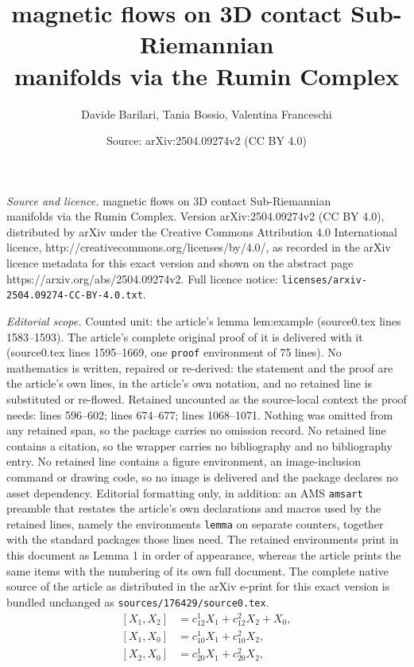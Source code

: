 \documentclass[10pt,a4paper]{amsart}
\title{magnetic flows on 3D contact Sub-Riemannian\\ manifolds via the Rumin Complex}
\author{Davide Barilari, Tania Bossio, Valentina Franceschi}
\date{Source: arXiv:2504.09274v2 (CC BY 4.0)}
\begin{document}
\maketitle

\noindent\emph{Source and licence.} magnetic flows on 3D contact Sub-Riemannian\\ manifolds via the Rumin Complex. Version arXiv:2504.09274v2 (CC BY 4.0), distributed by arXiv under the Creative Commons Attribution 4.0 International licence, http://creativecommons.org/licenses/by/4.0/, as recorded in the arXiv licence metadata for this exact version and shown on the abstract page https://arxiv.org/abs/2504.09274v2. Full licence notice: \texttt{licenses/arxiv-2504.09274-CC-BY-4.0.txt}.\par\smallskip

\noindent\textit{Editorial scope.} Counted unit: the article's lemma lem:example (source0.tex lines 1583--1593). The article's complete original proof of it is delivered with it (source0.tex lines 1595--1669, one \texttt{proof} environment of 75 lines). No mathematics is written, repaired or re-derived: the statement and the proof are the article's own lines, in the article's own notation, and no retained line is substituted or re-flowed.  Retained uncounted as the source-local context the proof needs: lines 596--602; lines 674--677; lines 1068--1071.  Nothing was omitted from any retained span, so the package carries no omission record.  No retained line contains a citation, so the wrapper carries no bibliography and no bibliography entry.  No retained line contains a figure environment, an image-inclusion command or drawing code, so no image is delivered and the package declares no asset dependency.  Editorial formatting only, in addition: an AMS \texttt{amsart} preamble that restates the article's own declarations and macros used by the retained lines, namely the environments \texttt{lemma} on separate counters, together with the standard packages those lines need.  The retained environments print in this document as Lemma 1 in order of appearance, whereas the article prints the same items with the numbering of its own full document.  The complete native source of the article as distributed in the arXiv e-print for this exact version is bundled unchanged as \texttt{sources/176429/source0.tex}.
\begin{equation}\label{eq:structurecoeff}
\begin{split}
\left[X_{1},X_{2}\right] & =c_{12}^{1}X_{1}+c_{12}^{2}X_{2}+X_{0}, \\
\left[X_{1},X_{0}\right] & =c_{10}^{1}X_{1}+c_{10}^{2}X_{2},\\
\left[X_{2},X_{0}\right] & =c_{20}^{1}X_{1}+c_{20}^{2}X_{2},
\end{split} 
\end{equation}
\end{document}
